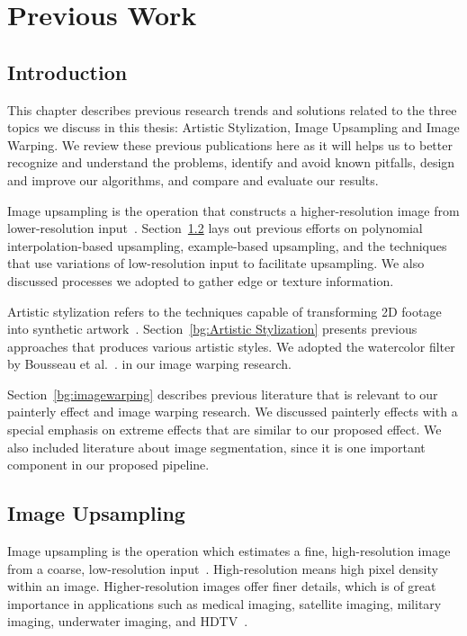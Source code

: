 \chapter{Previous Work}\label{chap:pw}

\section{Introduction}

This chapter describes previous research trends and solutions related to the three topics we discuss in this thesis: Artistic Stylization, Image Upsampling and Image Warping. We review these previous publications here as it will helps us to better recognize and understand the problems, identify and avoid known pitfalls, design and improve our algorithms, and compare and evaluate our results. 

Image upsampling is the operation that constructs a higher-resolution image from lower-resolution input~\cite{Shan:fiu}. Section~\ref{bg:upsampling} lays out previous efforts on polynomial interpolation-based upsampling, example-based upsampling, and the techniques that use variations of low-resolution input to facilitate upsampling. We also discussed processes we adopted to gather edge or texture information. 

Artistic stylization refers to the techniques capable of transforming 2D footage into synthetic artwork~\cite{NPRbook}. Section~\ref{bg:Artistic Stylization} presents previous approaches that produces various artistic styles. We adopted the watercolor filter by Bousseau et al.~\cite{Bousseau:2007}. in our image warping research.

Section~\ref{bg:imagewarping} describes previous literature that is relevant to our painterly effect and image warping research. We discussed painterly effects with a special emphasis on extreme effects that are similar to our proposed effect. We also included literature about image segmentation, since it is one important component in our proposed pipeline.

\newpage
\section{Image Upsampling } \label{bg:upsampling}

Image upsampling is the operation which estimates a fine, high-resolution image from a coarse, low-resolution input~\cite{Shan:fiu}. High-resolution means high pixel density within an image. Higher-resolution images offer finer details, which is of great importance in applications such as medical imaging, satellite imaging, military imaging, underwater imaging, and HDTV~\cite{book:superRes}. 

